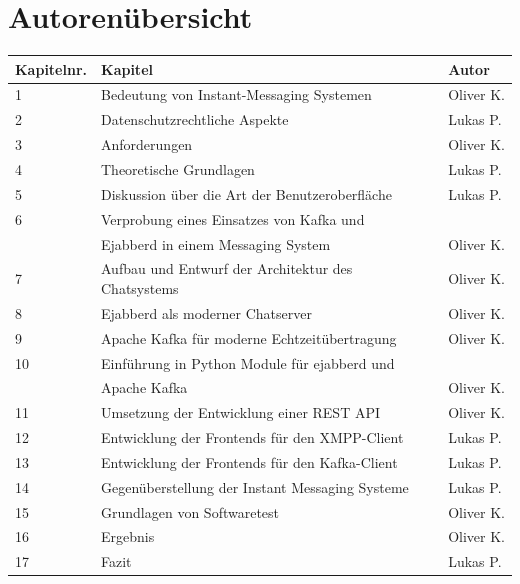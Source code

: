 \documentclass[a4paper,titlepage,halfparskip,12pt]{scrreprt}
\begin{document}


\newpage
{}

\chapter*{Autorenübersicht}
\renewcommand{\arraystretch}{1.5}
\begin{table}[h]
	\centering
	\begin{tabular*}{\linewidth}{lll@{\extracolsep{\fill}}}
		\textbf{Kapitelnr.} & \textbf{Kapitel} & \textbf{Autor} \\
		\hline
		1 & Bedeutung von Instant-Messaging Systemen & Oliver K. \\
		2 & Datenschutzrechtliche Aspekte & Lukas P.\\
		3 & Anforderungen & Oliver K. \\
		4 & Theoretische Grundlagen & Lukas P. \\
		5 & Diskussion über die Art der Benutzeroberfläche & Lukas P.\\
		6 & Verprobung eines Einsatzes von Kafka und &\\
		&Ejabberd in einem Messaging System & Oliver K.\\
		7 & Aufbau und Entwurf der Architektur des Chatsystems & Oliver K.\\
		8 & Ejabberd als moderner Chatserver & Oliver K.\\
		9 & Apache Kafka für moderne Echtzeitübertragung & Oliver K.\\
		10 & Einführung in Python Module für ejabberd und &\\
		& Apache Kafka & Oliver K.\\
		11 & Umsetzung der Entwicklung einer REST API & Oliver K.\\
		12 & Entwicklung der Frontends für den XMPP-Client & Lukas P.\\
		13 & Entwicklung der Frontends für den Kafka-Client & Lukas P.\\
		14 & Gegenüberstellung der Instant Messaging Systeme & Lukas P.\\
		15 & Grundlagen von Softwaretest & Oliver K.\\
		16 & Ergebnis & Oliver K.\\
		17 & Fazit & Lukas P.\\
	\end{tabular*}
	\label{tab:autorenuebersicht}
\end{table}
\end{document}
